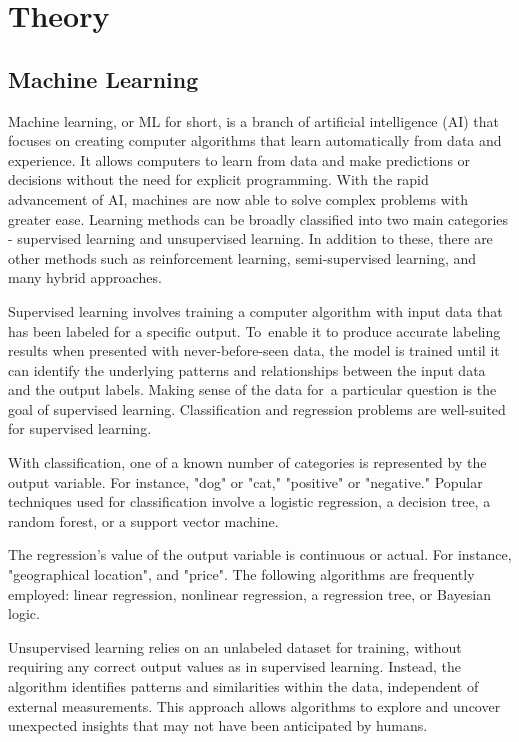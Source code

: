 \chapter{Theory}


\section{Machine Learning}
Machine learning, or ML for short, is a branch of artificial intelligence (AI) that focuses on creating computer algorithms that learn automatically from data and experience. It allows computers to learn from data and make predictions or decisions without the need for explicit programming.
With the rapid advancement of AI, machines are now able to solve complex problems with greater ease. Learning methods can be broadly classified into two main categories - supervised learning and unsupervised learning. In addition to these, there are other methods such as reinforcement learning, semi-supervised learning, and many hybrid approaches.

Supervised learning involves training a computer algorithm with input data that has been labeled for a specific output. To enable it to produce accurate labeling results when presented with never-before-seen data, the model is trained until it can identify the underlying patterns and relationships between the input data and the output labels. Making sense of the data for a particular question is the goal of supervised learning. Classification and regression problems are well-suited for supervised learning. 


With classification, one of a known number of categories is represented by the output variable. For instance, "dog" or "cat," "positive" or "negative." Popular techniques used for classification involve a logistic regression, a decision tree, a random forest, or a support vector machine.


The regression's value of the output variable is continuous or actual. For instance, "geographical location", and "price". The following algorithms are frequently employed: linear regression, nonlinear regression, a regression tree, or Bayesian logic.


Unsupervised learning relies on an unlabeled dataset for training, without requiring any correct output values as in supervised learning. Instead, the algorithm identifies patterns and similarities within the data, independent of external measurements. This approach allows algorithms to explore and uncover unexpected insights that may not have been anticipated by humans.

